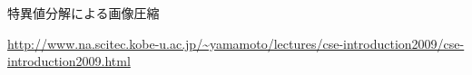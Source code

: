 \begin{frame}[t,fragile]{特異値分解による画像圧縮}
  \noindent%

  \hfill{\fontsize{5.5pt}{0pt}\selectfont \url{http://www.na.scitec.kobe-u.ac.jp/~yamamoto/lectures/cse-introduction2009/cse-introduction2009.html}}
\end{frame}
